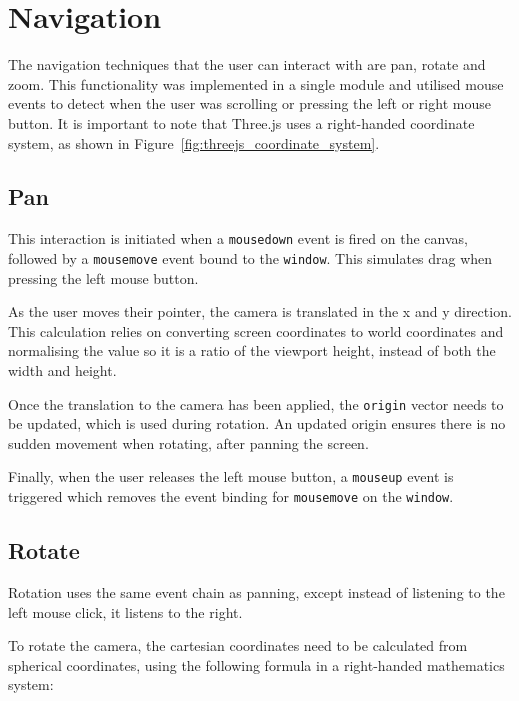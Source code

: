 \section{Navigation} {
\label{sec:navigation}

	The navigation techniques that the user can interact with are pan, rotate and zoom. This functionality was implemented in a single module and utilised mouse events to detect when the user was scrolling or pressing the left or right mouse button. It is important to note that Three.js uses a right-handed coordinate system, as shown in Figure~\ref{fig:threejs_coordinate_system}.

	

	\subsection{Pan} {
	\label{sec:pan}

		This interaction is initiated when a \texttt{mousedown} event is fired on the canvas, followed by a \texttt{mousemove} event bound to the \texttt{window}. This simulates drag when pressing the left mouse button.

		As the user moves their pointer, the camera is translated in the x and y direction. This calculation relies on converting screen coordinates to world coordinates and normalising the value so it is a ratio of the viewport height, instead of both the width and height.

		Once the translation to the camera has been applied, the \texttt{origin} vector needs to be updated, which is used during rotation. An updated origin ensures there is no sudden movement when rotating, after panning the screen.

		Finally, when the user releases the left mouse button, a \texttt{mouseup} event is triggered which removes the event binding for \texttt{mousemove} on the \texttt{window}. 

	}

	\subsection{Rotate} {
	\label{sec:rotate}

		Rotation uses the same event chain as panning, except instead of listening to the left mouse click, it listens to the right.

		To rotate the camera, the cartesian coordinates need to be calculated from spherical coordinates, using the following formula in a right-handed mathematics system:

}}
